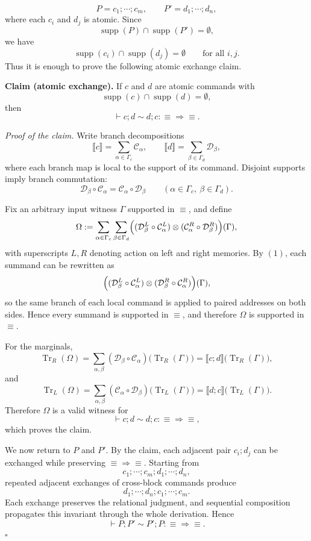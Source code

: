 \documentclass{report}
\theoremstyle{defn_style}
\begin{document}
\[
P=c_1;\cdots;c_m,
\qquad
P'=d_1;\cdots;d_n,
\]
where each $c_i$ and $d_j$ is atomic.
Since
\[
\operatorname{supp}(P)\cap\operatorname{supp}(P')=\emptyset,
\]
we have
\[
\operatorname{supp}(c_i)\cap\operatorname{supp}(d_j)=\emptyset
\qquad
\text{for all } i,j.
\]
Thus it is enough to prove the following atomic exchange claim.

\noindent
\textbf{Claim (atomic exchange).}
If $c$ and $d$ are atomic commands with
\[
\operatorname{supp}(c)\cap\operatorname{supp}(d)=\emptyset,
\]
then
\[
\vdash c;d \sim d;c : \equiv \Longrightarrow \equiv .
\]

\noindent
\emph{Proof of the claim.}
Write branch decompositions
\[
\llbracket c \rrbracket = \sum_{\alpha\in\Gamma_c}\mathcal{C}_\alpha,
\qquad
\llbracket d \rrbracket = \sum_{\beta\in\Gamma_d}\mathcal{D}_\beta,
\]
where each branch map is local to the support of its command.
Disjoint supports imply branch commutation:
\[
\mathcal{D}_\beta\circ\mathcal{C}_\alpha
=
\mathcal{C}_\alpha\circ\mathcal{D}_\beta
\qquad
(\alpha\in\Gamma_c,\ \beta\in\Gamma_d).
\tag{1}
\]

Fix an arbitrary input witness $\Gamma$ supported in $\equiv$, and define
\[
\Omega
:=
\sum_{\alpha\in\Gamma_c}\sum_{\beta\in\Gamma_d}
\Bigl(
(\mathcal{D}_\beta^L\circ\mathcal{C}_\alpha^L)
\otimes
(\mathcal{C}_\alpha^R\circ\mathcal{D}_\beta^R)
\Bigr)(\Gamma),
\]
with superscripts $L,R$ denoting action on left and right memories.
By \((1)\), each summand can be rewritten as
\[
\Bigl(
(\mathcal{D}_\beta^L\circ\mathcal{C}_\alpha^L)
\otimes
(\mathcal{D}_\beta^R\circ\mathcal{C}_\alpha^R)
\Bigr)(\Gamma),
\]
so the same branch of each local command is applied to paired addresses on both sides.
Hence every summand is supported in $\equiv$, and therefore $\Omega$ is supported in $\equiv$.

For the marginals,
\[
\operatorname{Tr}_R(\Omega)
=
\sum_{\alpha,\beta}(\mathcal{D}_\beta\circ\mathcal{C}_\alpha)\bigl(\operatorname{Tr}_R(\Gamma)\bigr)
=
\llbracket c;d\rrbracket\bigl(\operatorname{Tr}_R(\Gamma)\bigr),
\]
and
\[
\operatorname{Tr}_L(\Omega)
=
\sum_{\alpha,\beta}(\mathcal{C}_\alpha\circ\mathcal{D}_\beta)\bigl(\operatorname{Tr}_L(\Gamma)\bigr)
=
\llbracket d;c\rrbracket\bigl(\operatorname{Tr}_L(\Gamma)\bigr).
\]
Therefore $\Omega$ is a valid witness for
\[
\vdash c;d \sim d;c : \equiv \Longrightarrow \equiv,
\]
which proves the claim.

We now return to $P$ and $P'$. By the claim, each adjacent pair $c_i;d_j$ can be exchanged while preserving
\(
\equiv \Longrightarrow \equiv
\).
Starting from
\[
c_1;\cdots;c_m;d_1;\cdots;d_n,
\]
repeated adjacent exchanges of cross-block commands produce
\[
d_1;\cdots;d_n;c_1;\cdots;c_m.
\]
Each exchange preserves the relational judgment, and sequential composition propagates this invariant through the whole derivation. Hence
\[
\vdash P;P' \sim P';P : \equiv \Longrightarrow \equiv .
\]
\hfill$\square$
\end{document}
